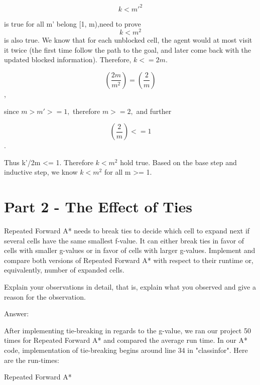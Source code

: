 \documentclass{article}
\begin{document}
$$k < m'^2$$
 
is true for all  m' belong [1, m),need to prove $$k < m^2$$ is also true. We know that for each unblocked cell, the agent would at most visit it twice (the first time follow the path to the goal, and later come back with the updated blocked information). Therefore, $k <= 2m.$ 

$$(\frac{2m}{m^2}) = (\frac{2}{m})$$, 

since $m > m' >= 1,$ therefore $m >= 2,$ and further 

$$(\frac{2}{m}) <= 1$$. 

Thus k'/2m <= 1. Therefore $k < m^2$ hold true.
Based on the base step and inductive step, we know $k < m^2$ for all m >= 1.




\section{Part 2 - The Effect of Ties}

Repeated Forward A* needs to break ties to decide which cell to expand next if
several cells have the same smallest f-value. It can either break ties in favor of cells with smaller g-values or in favor of
cells with larger g-values. Implement and compare both versions of Repeated Forward A* with respect to their runtime or,
equivalently, number of expanded cells.


\begin{question}
	Explain your observations in detail, that is, explain what you observed and give a
reason for the observation.

\end{question}

Answer: \newline
\par After implementing tie-breaking in regards to the g-value, we ran our project 50 times for Repeated Forward A* and compared the average run time. In our A* code, implementation of tie-breaking begins around line 34 in "classinfor".
Here are the run-times:

Repeated Forward A*
\end{document}
